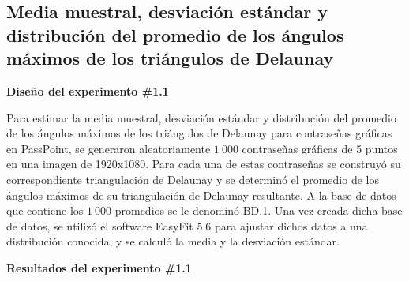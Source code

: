 \documentclass[12pt]{report}
\begin{document}
\subsection{Media muestral, desviación estándar y distribución del promedio de los ángulos máximos de los triángulos de Delaunay }
\label{sec:1.1}

	\textbf{Diseño del experimento \#1.1}
	
	 Para estimar la media muestral, desviación estándar y distribución del promedio de los ángulos máximos de los triángulos de Delaunay para contraseñas gráficas en PassPoint, se generaron aleatoriamente $1\ 000$ contraseñas gráficas de 5 puntos en una imagen de 1920x1080. Para cada una de estas contraseñas se  construyó  su correspondiente triangulación  de Delaunay  y se  determinó el promedio  de los ángulos máximos de su triangulación de Delaunay resultante. A la base de datos que contiene los $1\ 000$ promedios se le denominó BD.1. Una vez creada dicha base de datos, se utilizó el software EasyFit 5.6 para ajustar dichos datos a una distribución conocida, y se calculó la media y la desviación estándar.
	 
	 \textbf{Resultados del experimento \#1.1}
	 
\end{document}
